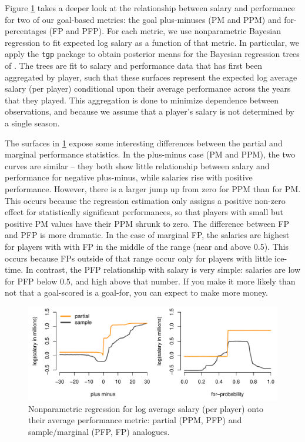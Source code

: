 Figure \ref{fig:salaryreg} takes a deeper look at the relationship between
salary and performance for two of our goal-based metrics: the goal
plus-minuses (PM and PPM) and for-percentages (FP and PFP). For each metric,
we use nonparametric Bayesian regression to fit expected log salary as a
function of that metric.   In particular, we apply the {\tt tgp} package
\cite{gramacy_tgp:_2007,gramacy_categorical_2010} to obtain posterior means
for the Bayesian regression trees of
\cite{chipman_bayesian_2002}.  The trees are fit to salary and performance
data that has first been aggregated by player, such that these surfaces
represent the expected log average salary (per player) conditional upon their
average performance across the years that they played.  This aggregation is
done  to minimize dependence between observations, and because we assume that
a player's salary is not determined by a single season.

The surfaces in \ref{fig:salaryreg} expose some interesting differences
between the partial and marginal performance statistics.  In the plus-minus
case (PM and PPM), the two curves are similar -- they both show little
relationship between salary and performance for negative plus-minus, while
salaries rise with positive performance.   However, there is a larger jump up
from zero for PPM  than for PM.  This occurs because the regression estimation
only assigns a positive non-zero effect for statistically significant
performances, so that players with small but positive PM values have their PPM
shrunk to zero.  The difference between FP and PFP is more dramatic.  In the
case of marginal FP, the salaries are highest for players with with FP in the
middle of the range (near and above 0.5).  This occurs because FPs outside of
that range occur only for players with little ice-time.  In contrast, the PFP
relationship with salary is very simple: salaries are low for PFP below 0.5,
and high above that number.  If you make it more likely than not that a
goal-scored is a goal-for, you can expect to make more money.


\begin{figure}[tbh]
    \centering
    \includegraphics[width=\textwidth]{figures/salreg-goals.pdf}
    \caption{Nonparametric regression for log average salary (per player) onto their average performance metric: 
    partial (PPM, PFP) and sample/marginal (PFP, FP) analogues.  }\label{fig:salaryreg}
\end{figure}

